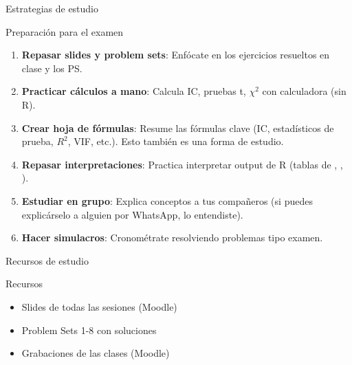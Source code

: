 \documentclass[aspectratio=169, 11pt]{beamer}
\begin{document}
\begin{frame}{Estrategias de estudio}
\begin{block}{Preparación para el examen}
\begin{enumerate}
\item \textbf{Repasar slides y problem sets}: Enfócate en los ejercicios resueltos en clase y los PS.

\item \textbf{Practicar cálculos a mano}: Calcula IC, pruebas t, $\chi^2$ con calculadora (sin R).

\item \textbf{Crear hoja de fórmulas}: Resume las fórmulas clave (IC, estadísticos de prueba, $R^2$, VIF, etc.). Esto también es una forma de estudio.

\item \textbf{Repasar interpretaciones}: Practica interpretar output de R (tablas de , , ).

\item \textbf{Estudiar en grupo}: Explica conceptos a tus compa\~neros (si puedes explic\'arselo a alguien por WhatsApp, lo entendiste).

\item \textbf{Hacer simulacros}: Cronométrate resolviendo problemas tipo examen.
\end{enumerate}
\end{block}
\end{frame}

\begin{frame}{Recursos de estudio}
\begin{alertblock}{Recursos}
\begin{itemize}
\item Slides de todas las sesiones (Moodle)
\item Problem Sets 1-8 con soluciones
\item Grabaciones de las clases (Moodle)
\end{itemize}
\end{alertblock}
\end{frame}
\end{document}
